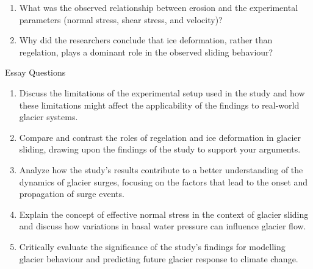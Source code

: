 \begin{enumerate}
\item What was the observed relationship between erosion and the experimental parameters (normal stress, shear stress, and velocity)?

\item Why did the researchers conclude that ice deformation, rather than regelation, plays a dominant role in the observed sliding behaviour?
\end{enumerate}%
    

Essay Questions
\begin{enumerate}
\item Discuss the limitations of the experimental setup used in the study and how these limitations might affect the applicability of the findings to real-world glacier systems.
\item Compare and contrast the roles of regelation and ice deformation in glacier sliding, drawing upon the findings of the study to support your arguments.
\item Analyze how the study's results contribute to a better understanding of the dynamics of glacier surges, focusing on the factors that lead to the onset and propagation of surge events.
\item Explain the concept of effective normal stress in the context of glacier sliding and discuss how variations in basal water pressure can influence glacier flow.
\item Critically evaluate the significance of the study's findings for modelling glacier behaviour and predicting future glacier response to climate change.
\end{enumerate}
    
    

